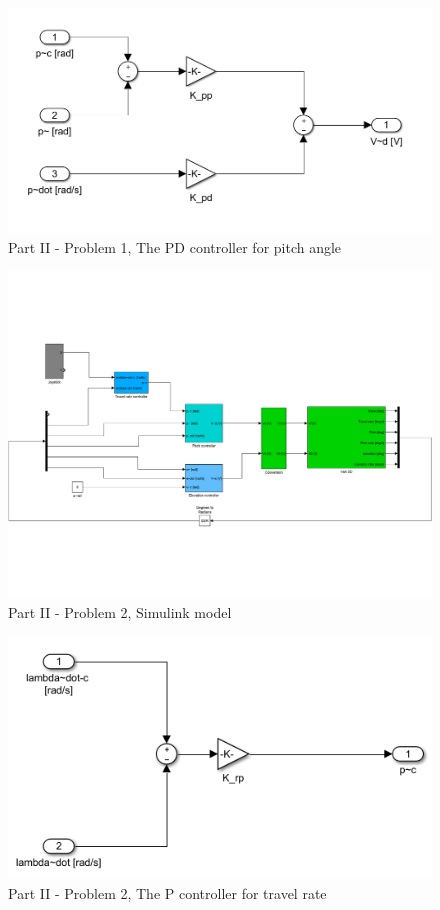 \begin{figure}[htb]
	\centering
		\includegraphics[width=\textwidth]{models/P2p1_PD.PNG}
	\caption{Part II - Problem 1, The PD controller for pitch angle}
\label{fig:P2p1_PD}
\end{figure}

\begin{figure}[htb]
	\centering
		\includegraphics[width=\textwidth]{models/P2p2.pdf}
	\caption{Part II - Problem 2, Simulink model}
\label{fig:P2p2}
\end{figure}

\begin{figure}[htb]
	\centering
		\includegraphics[width=\textwidth]{models/P2p2_travel_controller.PNG}
	\caption{Part II - Problem 2, The P controller for travel rate}
\label{fig:P2p2_P}
\end{figure}

